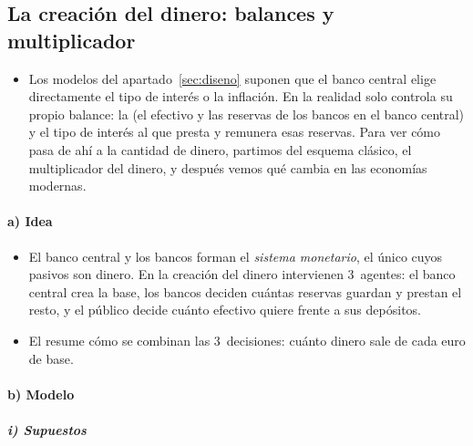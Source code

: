 \documentclass[11pt]{article}
\begin{document}
\subsection{La creación del dinero: balances y multiplicador}\label{sec:creacion-dinero}

\begin{itemize}
\item Los modelos del apartado~\ref{sec:diseno} suponen que el banco central elige directamente el tipo de interés o la inflación. En la realidad solo controla su propio balance: la  (el efectivo y las reservas de los bancos en el banco central) y el tipo de interés al que presta y remunera esas reservas. Para ver cómo pasa de ahí a la cantidad de dinero, partimos del esquema clásico, el multiplicador del dinero, y después vemos qué cambia en las economías modernas.
\end{itemize}

\paragraph{a) Idea}

\begin{itemize}
\item El banco central y los bancos forman el \emph{sistema monetario}, el único cuyos pasivos son dinero. En la creación del dinero intervienen 3~agentes: el banco central crea la base, los bancos deciden cuántas reservas guardan y prestan el resto, y el público decide cuánto efectivo quiere frente a sus depósitos.
\item El  resume cómo se combinan las 3~decisiones: cuánto dinero sale de cada euro de base.
\end{itemize}

\paragraph{b) Modelo}

\subparagraph{i) Supuestos}
\end{document}
